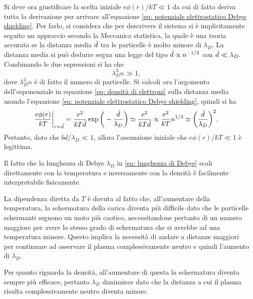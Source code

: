 Si deve ora giustificare la scelta iniziale $e\phi(r)/kT \ll 1$ da cui di fatto deriva tutta la derivazione per arrivare all'equazione \eqref{eq: potenziale elettrostatico Debye shielding}. Per farlo, si considera che per descrivere il sistema si è implicitamente seguito un approccio secondo la Meccanica statistica, la quale è una teoria accurata se la distanza media $\bar{d}$ tra le particelle è molto minore di $\lambda_D$. La distanza media si può dedurre segua una legge del tipo $\bar{d} \propto n^{-1/3}$ con $\bar{d} \ll \lambda_D$. Combinando le due espressioni si ha che 
\begin{equation}
    \lambda_D^3n \gg 1,
\end{equation}
dove $\lambda_D^3n$ è di fatto il numero di particelle. Si calcoli ora l'argomento dell'esponenziale in equazione \eqref{eq: densità di elettroni} sulla distanza media usando l'equazione \eqref{eq: potenziale elettrostatico Debye shielding}, quindi si ha
\begin{equation}
    \frac{e\phi(r)}{kT}\bigg|_{r = \bar{d}} = \frac{e^2}{kT\bar{d}}\exp{\bigg(-\frac{\bar{d}}{\lambda_D}\bigg)} \simeq \frac{e^2}{kT\bar{d}} \propto \frac{e^2}{kT}n^{1/3} \simeq \bigg(\frac{\bar{d}}{\lambda_D}\bigg)^2.
\end{equation}
Pertanto, dato che $b{d}/\lambda_D \ll 1$, allora l'assunzione iniziale che $e\phi(r)/kT \ll 1$ è legittima.
\begin{obs}
    Il fatto che la lunghezza di Debye $\lambda_D$ in \eqref{eq: lunghezza di Debye} scali direttamente con la temperatura e inversamente con la densità è facilmente interpretabile fisicamente. 
    
    La dipendenza diretta da $T$ è dovuta al fatto che, all'aumentare della temperatura, la schermatura della carica diventa più difficile dato che le particelle schermanti seguono un moto più caotico, necessitandone pertanto di un numero maggiore per avere lo stesso grado di schermatura che si avrebbe ad una temperatura minore. Questo implica la necessità di andare a distanze maggiori per continuare ad osservare il plasma complessivamente neutro e quindi l'aumento di $\lambda_D$.
    
    Per quanto riguarda la densità, all'aumentare di questa la schermatura diventa sempre più efficace, pertanto $\lambda_D$ diminuisce dato che la distanza a cui il plasma risulta complessivamente neutro diventa minore. 
\end{obs}

